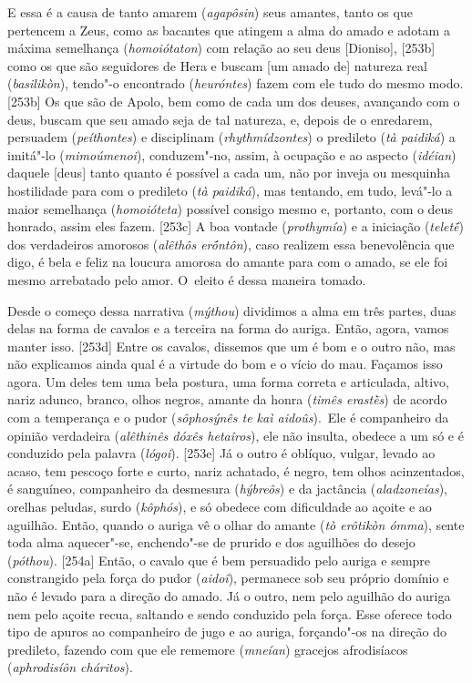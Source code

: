 E essa é a causa de tanto amarem (\emph{agapôsin}) seus amantes, tanto
os que pertencem a Zeus, como as bacantes que atingem a alma do amado e
adotam a máxima semelhança (\emph{homoiótaton}) com relação ao seu deus
[Dioniso], [253b] como os que são seguidores de Hera e buscam
[um amado de] natureza real (\emph{basilikòn}), tendo"-o encontrado
(\emph{heuróntes}) fazem com ele tudo do mesmo modo. [253b] Os que
são de Apolo, bem como de cada um dos deuses, avançando com o deus,
buscam que seu amado seja de tal natureza, e, depois de o enredarem,
persuadem (\emph{peíthontes}) e disciplinam (\emph{rhythmídzontes}) o
predileto (\emph{tà paidiká}) a imitá"-lo (\emph{mimoúmenoi}),
conduzem"-no, assim, à ocupação e ao aspecto (\emph{idéian}) daquele
[deus] tanto quanto é possível a cada um, não por inveja ou
mesquinha hostilidade para com o predileto (\emph{tà paidiká}), mas
tentando, em tudo, levá"-lo a maior semelhança (\emph{homoióteta})
possível consigo mesmo e, portanto, com o deus honrado, assim eles
fazem. [253c] A boa vontade (\emph{prothymía}) e a iniciação
(\emph{teletḗ}) dos verdadeiros amorosos (\emph{alêthôs erṓntôn}), caso
realizem essa benevolência que digo, é bela e feliz na loucura amorosa
do amante para com o amado, se ele foi mesmo arrebatado pelo amor. O~eleito é dessa maneira tomado.

Desde o começo dessa narrativa (\emph{mýthou}) dividimos a alma em três
partes, duas delas na forma de cavalos e a terceira na forma do auriga.
Então, agora, vamos manter isso. [253d] Entre os cavalos, dissemos
que um é bom e o outro não, mas não explicamos ainda qual é a virtude do
bom e o vício do mau. Façamos isso agora. Um deles tem uma bela postura,
uma forma correta e articulada, altivo, nariz adunco, branco, olhos
negros, amante da honra (\emph{timês erastḕs}) de acordo com a
temperança e o pudor (\emph{sôphosýnês te kaì aidoûs}).~Ele é
companheiro da opinião verdadeira (\emph{alêthinês dóxês hetaîros}), ele
não insulta, obedece a um só e é conduzido pela palavra (\emph{lógoi}).
[253e] Já o outro é oblíquo, vulgar, levado ao acaso, tem pescoço
forte e curto, nariz achatado, é negro, tem olhos acinzentados, é
sanguíneo, companheiro da desmesura (\emph{hýbreôs}) e da jactância
(\emph{aladzoneías}), orelhas peludas, surdo (\emph{kôphós}), e só
obedece com dificuldade ao açoite e ao aguilhão. Então, quando o auriga
vê o olhar do amante (\emph{tò erôtikòn ómma}), sente toda alma
aquecer"-se, enchendo"-se de prurido e dos aguilhões do desejo
(\emph{póthou}). [254a] Então, o cavalo que é bem persuadido pelo
auriga e sempre constrangido pela força do pudor (\emph{aidoî}),
permanece sob seu próprio domínio e não é levado para a direção do
amado. Já o outro, nem pelo aguilhão do auriga nem pelo açoite recua,
saltando e sendo conduzido pela força. Esse oferece todo tipo de apuros
ao companheiro de jugo e ao auriga, forçando"-os na direção do predileto,
fazendo com que ele rememore (\emph{mneían}) gracejos afrodisíacos
(\emph{aphrodisíôn cháritos}).

